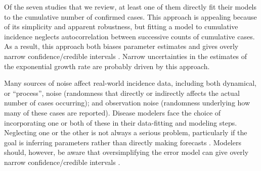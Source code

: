 \documentclass[12pt]{article}
\begin{document}
Of the seven studies that we review, at least one of them directly fit their models to the cumulative number of confirmed cases.
This approach is appealing because of its simplicity and apparent robustness, but fitting a model to cumulative incidence neglects autocorrelation between successive counts of cumulative cases. 
As a result, this approach both biases parameter estimates and gives overly narrow confidence/credible intervals \citep{ma2014estimating, king2015avoidable}.
Narrow uncertainties in the estimates of the exponential growth rate are probably driven by this approach.

Many sources of noise affect real-world incidence data, including both dynamical, or ``process'', noise (randomness that directly or indirectly affects the actual number of cases occurring); and observation noise (randomness underlying how many of these cases are reported).  
Disease modelers face the choice of incorporating one or both of these in their data-fitting and modeling steps. 
Neglecting one or the other is not always a serious problem, particularly if the goal is inferring parameters rather than directly making forecasts \citep{ma2014estimating}.
Modelers should, however, be aware that oversimplifying the error model can give overly narrow confidence/credible intervals \citep{king2015avoidable,taylor2016stochasticity}.
\end{document}
